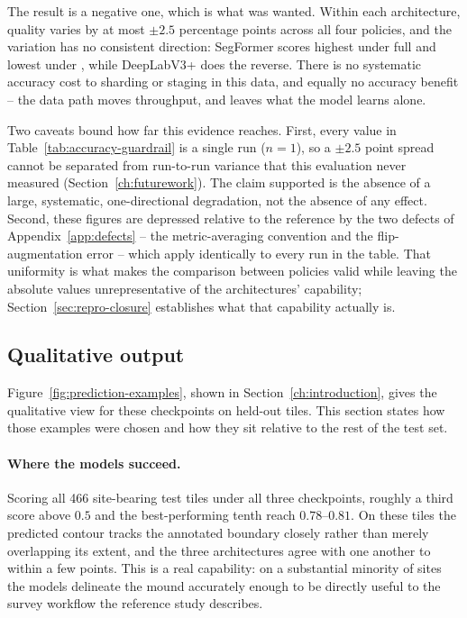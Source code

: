 The result is a negative one, which is what was wanted. Within each
architecture, quality varies by at most $\pm2.5$ percentage points across all
four policies, and the variation has no consistent direction: SegFormer scores
highest under full \pads{} and lowest under , while DeepLabV3+ does
the reverse. There is no systematic accuracy cost to sharding or staging in this
data, and equally no accuracy benefit -- the data path moves throughput, and
leaves what the model learns alone.

Two caveats bound how far this evidence reaches. First, every value in
Table~\ref{tab:accuracy-guardrail} is a single run ($n=1$), so a $\pm2.5$ point
spread cannot be separated from run-to-run variance that this evaluation never
measured (Section~\ref{ch:futurework}). The claim supported is the absence of a
large, systematic, one-directional degradation, not the absence of any effect.
Second, these figures are depressed relative to the reference by the two defects
of Appendix~\ref{app:defects} -- the metric-averaging convention and the
flip-augmentation error -- which apply identically to every run in the table.
That uniformity is what makes the comparison between policies valid while
leaving the absolute values unrepresentative of the architectures' capability;
Section~\ref{sec:repro-closure} establishes what that capability actually is.

\subsection{Qualitative output}
\label{sec:repro-qualitative}

Figure~\ref{fig:prediction-examples}, shown in Section~\ref{ch:introduction},
gives the qualitative view for these checkpoints on held-out tiles. This section
states how those examples were chosen and how they sit relative to the rest of
the test set.

\paragraph{Where the models succeed.}
Scoring all 466 site-bearing test tiles under all three checkpoints, roughly a
third score above $0.5$ and the best-performing tenth reach $0.78$--$0.81$. On
these tiles the predicted contour tracks the annotated boundary closely rather
than merely overlapping its extent, and the three architectures agree with one
another to within a few points. This is a real capability: on a substantial
minority of sites the models delineate the mound accurately enough to be
directly useful to the survey workflow the reference study describes.

